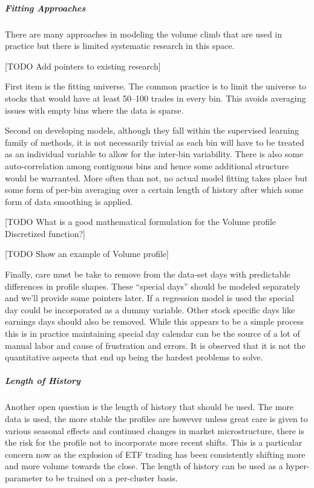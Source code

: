 \subparagraph{Fitting Approaches}

There are many approaches in modeling the volume climb that are used in practice but there is limited systematic research in this space. 

[TODO Add pointers to existing research]

First item is the fitting universe. The common practice is to limit the universe to stocks that would have at least 50--100 trades in every bin. This avoids averaging issues with empty bins where the data is sparse.


Second on developing models, although they fall within the supervised learning family of methods, it is not necessarily trivial as each bin will have to be treated as an individual variable to allow for the inter-bin variability. There is also some auto-correlation among contiguous bins and hence some additional structure would be warranted. More often than not, no actual model fitting takes place but some form of per-bin averaging over a certain length of history after which some form of data smoothing is applied.  

[TODO What is a good mathematical formulation for the Volume profile Discretized function?]

[TODO Show an example of Volume profile]

Finally, care must be take to remove from the data-set days with predictable differences in profile shapes. These ``special days'' should be modeled separately and we'll provide some pointers later. If a regression model is used the special day could be incorporated as a dummy variable. Other stock specific days like earnings days should also be removed. While this appears to be a simple process this is in practice maintaining special day calendar can be the source of a lot of manual labor and cause of frustration and errors. It is observed that it is not the quantitative aspects that end up being the hardest problems to solve.


\subparagraph{Length of History}

Another open question is the length of history that should be used. The more data is used, the more stable the profiles are however unless great care is given to various seasonal effects and continued changes in market microstructure, there is the risk for the profile not to incorporate more recent shifts. This is a particular concern now as the explosion of ETF trading has been consistently shifting more and more volume towards the close. The length of history can be used as a hyper-parameter to be trained on a per-cluster basis.


